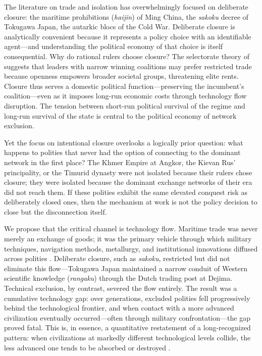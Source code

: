 \documentclass[pdflatex,sn-basic]{sn-jnl}
\theoremstyle{thmstyleone}%
\theoremstyle{thmstyletwo}%
\theoremstyle{thmstylethree}%
\begin{document}
The literature on trade and isolation has overwhelmingly focused on deliberate closure: the maritime prohibitions (\emph{haijin}) of Ming China, the \emph{sakoku} decree of Tokugawa Japan, the autarkic blocs of the Cold War. Deliberate closure is analytically convenient because it represents a policy choice with an identifiable agent---and understanding the political economy of that choice is itself consequential. Why do rational rulers choose closure? The selectorate theory of \citet{BuenodeMesquita2003} suggests that leaders with narrow winning coalitions may prefer restricted trade because openness empowers broader societal groups, threatening elite rents. Closure thus serves a domestic political function---preserving the incumbent's coalition---even as it imposes long-run economic costs through technology flow disruption. The tension between short-run political survival of the regime and long-run survival of the state is central to the political economy of network exclusion.

Yet the focus on intentional closure overlooks a logically prior question: what happens to polities that never had the option of connecting to the dominant network in the first place? The Khmer Empire at Angkor, the Kievan Rus' principality, or the Timurid dynasty were not isolated because their rulers chose closure; they were isolated because the dominant exchange networks of their era did not reach them. If these polities exhibit the same elevated conquest risk as deliberately closed ones, then the mechanism at work is not the policy decision to close but the disconnection itself.

We propose that the critical channel is technology flow. Maritime trade was never merely an exchange of goods; it was the primary vehicle through which military techniques, navigation methods, metallurgy, and institutional innovations diffused across polities \citep{Pomeranz2000, Mokyr2002}. Deliberate closure, such as \emph{sakoku}, restricted but did not eliminate this flow---Tokugawa Japan maintained a narrow conduit of Western scientific knowledge (\emph{rangaku}) through the Dutch trading post at Dejima. Technical exclusion, by contrast, severed the flow entirely. The result was a cumulative technology gap: over generations, excluded polities fell progressively behind the technological frontier, and when contact with a more advanced civilization eventually occurred---often through military confrontation---the gap proved fatal. This is, in essence, a quantitative restatement of a long-recognized pattern: when civilizations at markedly different technological levels collide, the less advanced one tends to be absorbed or destroyed \citep{Diamond1997}.
\end{document}
